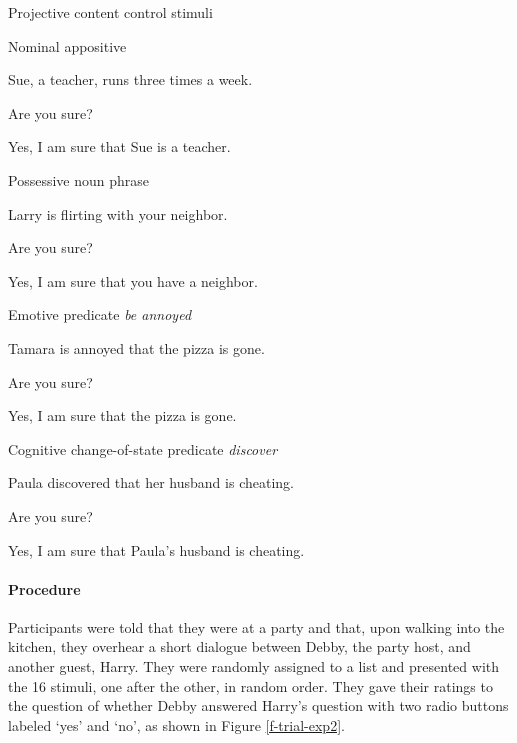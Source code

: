 \documentclass[11pt,fleqn]{article}
\newcommand{\6}{\mbox{$[\hspace*{-.6mm}[$}}
\newcommand{\9}{\mbox{$]\hspace*{-.6mm}]$}}
\begin{document}
\begin{exe}
\ex\label{proj} Projective content control stimuli

\begin{xlist}

\ex Nominal appositive
\begin{xlist}
 Sue, a teacher, runs three times a week.

 Are you sure?

 Yes, I am sure that Sue is a teacher.
\end{xlist}


\ex Possessive noun phrase
\begin{xlist}
 Larry is flirting with your neighbor.

 Are you sure?

 Yes, I am sure that you have a neighbor.
\end{xlist}

\ex Emotive predicate {\em be annoyed} 
\begin{xlist}
 Tamara is annoyed that the pizza is gone.

 Are you sure?

 Yes, I am sure that the pizza is gone.
\end{xlist}

\ex Cognitive change-of-state predicate {\em discover}
\begin{xlist}
 Paula discovered that her husband is cheating.

 Are you sure?

 Yes, I am sure that Paula's husband is cheating.
\end{xlist}
\end{xlist}
\end{exe}

\paragraph{Procedure} 

Participants were told that they were at a party and that, upon walking into the kitchen, they overhear a short dialogue between Debby, the party host, and another guest, Harry. They were randomly assigned to a list and presented with the 16 stimuli, one after the other, in random order. They gave their ratings to the question of whether Debby answered Harry's question with two radio buttons labeled `yes' and `no', as shown in Figure \ref{f-trial-exp2}.  
\end{document}
